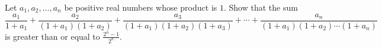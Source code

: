 Let $a_1,a_2,\dots,a_n$ be positive real numbers whose product is $1$. Show that the sum \[\textstyle\frac{a_1}{1+a_1}+\frac{a_2}{(1+a_1)(1+a_2)}+\frac{a_3}{(1+a_1)(1+a_2)(1+a_3)}+\cdots+\frac{a_n}{(1+a_1)(1+a_2)\cdots(1+a_n)}\] is greater than or equal to $\frac{2^n-1}{2^n}$.
